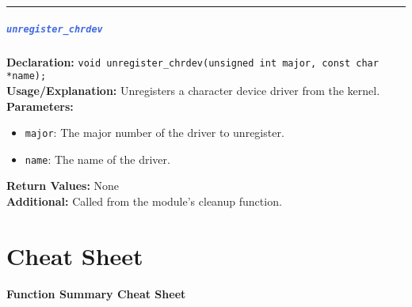 \documentclass[openany,12pt]{book}
\newcommand{\code}[1]{\texttt{#1}}
\newcommand{\blue}[1]{\textcolor{RoyalBlue}{#1}}
\newcommand{\functionEntryPar}[6]{%
  \noindent\rule{\linewidth}{0.5pt}
  \subsubsection*{\blue{\large{\texttt{#1}}}}
  \textbf{Declaration:} \texttt{#2} \\
  \textbf{Usage/Explanation:} #3 \\
  \textbf{Parameters:}
  \begin{itemize}[leftmargin=*]
    #4
  \end{itemize}
  \textbf{Return Values:} #5 \\
  \textbf{Additional:} #6
  \vspace{1em}
}
\begin{document}
\functionEntryPar{unregister\_chrdev}
{void unregister\_chrdev(unsigned int major, const char *name);}
{Unregisters a character device driver from the kernel.}
{\item \code{major}: The major number of the driver to unregister.
 \item \code{name}: The name of the driver.}
{None}
{Called from the module's cleanup function.\label{func:unregister_chrdev}}


\part{Cheat Sheet}


\begin{center}
  \textbf{Function Summary Cheat Sheet}
\end{center}
\vspace{-2em}
\end{document}
